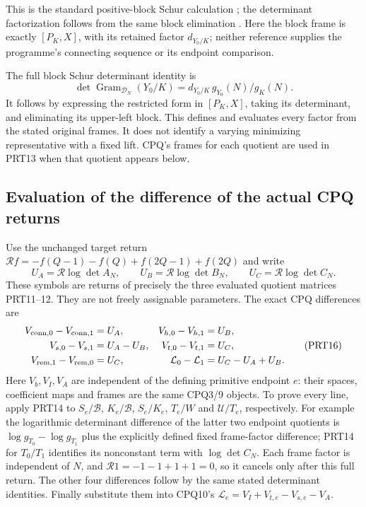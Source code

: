 \documentclass[11pt,a4paper]{article}
\begin{document}
This is the standard positive-block Schur calculation
\cite[\S2.1, (2.3)--(2.4)]{human:boyd1994}; the determinant
factorization follows from the same block elimination
\cite[p.~222, (6a)--(6b)]{human:hager1989}.
Here the block frame is exactly $[P_K,X]$, with its retained
factor $d_{Y_0/K}$; neither reference supplies the programme's
connecting sequence or its endpoint comparison.

The full block Schur determinant identity is
\[
 \det\operatorname{Gram}_{\mathcal D_N}(Y_0/K)
       =d_{Y_0/K}\,g_{Y_0}(N)/g_K(N).
 \tag{PRT14}
\]
It follows by expressing the restricted form in $[P_K,X]$,
taking its determinant, and eliminating its upper-left block.
This defines and evaluates every factor from the stated original
frames. It does not identify a varying minimizing representative
with a fixed lift. CPQ's frames for each quotient are used in
PRT13 when that quotient appears below.

\subsection{Evaluation of the difference of the actual CPQ returns}

Use the unchanged target return
$\mathcal Rf=-f(Q-1)-f(Q)+f(2Q-1)+f(2Q)$ and write
\[
 U_A=\mathcal R\log\det A_N,\qquad
 U_B=\mathcal R\log\det B_N,\qquad
 U_C=\mathcal R\log\det C_N.
 \tag{PRT15}
\]
These symbols are returns of precisely the three evaluated quotient
matrices PRT11--12. They are not freely assignable parameters.
The exact CPQ differences are
\[
 \begin{aligned}
 V_{{\rm conn},0}-V_{{\rm conn},1}&=U_A,&
 V_{h,0}-V_{h,1}&=U_B,\\
 V_{s,0}-V_{s,1}&=U_A-U_B,&
 V_{t,0}-V_{t,1}&=U_C,\\
 V_{{\rm rem},1}-V_{{\rm rem},0}&=U_C,&
 \mathcal L_0-\mathcal L_1&=U_C-U_A+U_B.
 \end{aligned}\tag{PRT16}
\]
Here $V_b,V_I,V_A$ are independent of the defining primitive endpoint
$e$: their spaces, coefficient maps and frames are the same CPQ3/9
objects. To prove every line, apply PRT14 to
$S_e/\mathscr B$, $K_e/\mathscr B$, $S_e/K_e$, $T_e/W$ and
$\mathcal U/T_e$, respectively. For example the logarithmic
determinant difference of the latter two endpoint quotients is
$\log g_{T_0}-\log g_{T_1}$ plus the explicitly defined fixed
frame-factor difference; PRT14 for $T_0/T_1$ identifies its
nonconstant term with $\log\det C_N$.
Each frame factor is independent of $N$, and
$\mathcal R1=-1-1+1+1=0$, so it cancels only after this full return.
The other four differences follow by the same stated determinant
identities. Finally substitute them into CPQ10's
$\mathcal L_e=V_I+V_{t,e}-V_{s,e}-V_A$.
\end{document}
